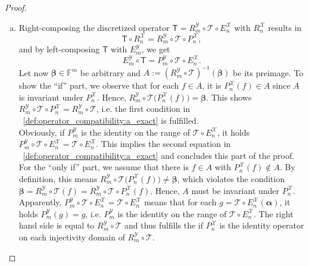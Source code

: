 \documentclass[a4paper]{paper}
\newcommand{\VecSpace}[1]{\mathscr{#1}}
\newcommand{\Field}{\mathbb{F}}
\newcommand{\Op}[1]{\mathcal{#1}}
\newcommand{\DiscOp}[1]{\mathsf{#1}}
\newcommand*{\EXT}[2]{\ensuremath{E_{#1}^{#2}}}
\newcommand*{\REST}[2]{\ensuremath{R_{#1}^{#2}}}
\newcommand*{\PROJ}[2]{\ensuremath{P_{#1}^{#2}}}
\newcommand*{\RnX}{\ensuremath{\REST{n}{\VecSpace{X}}}}
\newcommand*{\RmY}{\ensuremath{\REST{m}{\VecSpace{Y}}}}
\newcommand*{\EnX}{\ensuremath{\EXT{n}{\VecSpace{X}}}}
\newcommand*{\EmY}{\ensuremath{\EXT{m}{\VecSpace{Y}}}}
\newcommand*{\PnX}{\ensuremath{\PROJ{n}{\VecSpace{X}}}}
\newcommand*{\PmY}{\ensuremath{\PROJ{m}{\VecSpace{Y}}}}
\newcommand{\valpha}{\boldsymbol{\alpha}}
\newcommand{\vbeta}{\boldsymbol{\beta}}
\begin{document}
\begin{proof}
 \begin{enumerate}[a)]
  \item Right-composing the discretized operator $\DiscOp{T} = \RmY \circ \Op{T} \circ \EnX$ with $\RnX$ results in
  \begin{equation*}
   \DiscOp{T} \circ \RnX = \RmY \circ \Op{T} \circ \PnX,
  \end{equation*}
  and by left-composing $\DiscOp{T}$ with $\EmY$, we get
  \begin{equation*}
   \EmY \circ \DiscOp{T} = \PmY \circ \Op{T} \circ \EnX.
  \end{equation*}
  Let now $\vbeta \in \Field^m$ be arbitrary and $A := (\RmY \circ \Op{T})^{-1}({\vbeta})$ be its preimage.
  To show the ``if'' part, we observe that for each $f \in A$, it is $\PnX(f) \in A$ since $A$ is invariant under $\PnX$. Hence, 
  $\RmY \circ \Op{T} \big( \PnX(f) \big) = \vbeta$. This shows $\RmY \circ \Op{T} \circ \PnX = \RmY \circ \Op{T}$, i.e. the first condition 
  in ~\eqref{def:operator_compatibility:a_exact} is fulfilled.\\
  Obviously, if $\PmY$ is the identity on the range of $\Op{T} \circ \EnX$, it holds 
  $\PmY \circ \Op{T} \circ \EnX = \Op{T} \circ \EnX$. This implies the second equation in 
  ~\eqref{def:operator_compatibility:a_exact} and concludes this part of the proof.
  For the ``only if'' part, we assume that there is $f \in A$ with $\PnX(f) \not\in A$. By definition, this means 
  $\RmY \circ \Op{T} \big( \PnX(f) \big) \neq \vbeta$, which violates the condition
  $\vbeta = \RmY \circ \Op{T} (f) = \RmY \circ \Op{T} \circ \PnX (f)$. Hence, $A$ must be invariant under $\PnX$.\\
  Apparently, $\PmY \circ \Op{T} \circ \EnX = \Op{T} \circ \EnX$ means that for each $g = \Op{T} \circ \EnX(\valpha)$, it holds
  $\PmY(g) = g$, i.e. $\PmY$ is the identity on the range of $\Op{T} \circ \EnX$.
  The right hand side is equal to $\RmY \circ \Op{T}$ and thus fulfills the  if $\PnX$ is the identity operator on each
  injectivity domain of $\RmY \circ \Op{T}$.\\[1ex]


\end{enumerate}
\end{proof}
\end{document}
